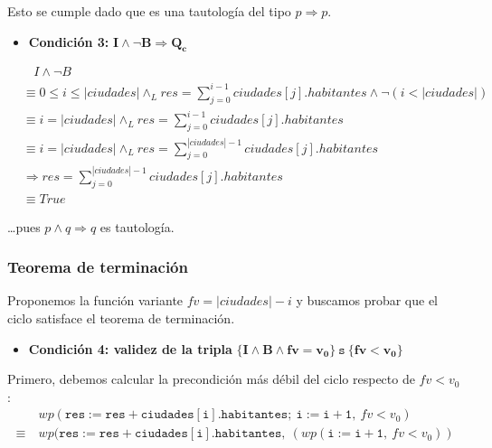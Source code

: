 \documentclass[10pt,a4paper]{article}
\begin{document}
Esto se cumple dado que es una tautología del tipo $p \Rightarrow p$. \\


\begin{itemize}
    \item{\textbf{Condición 3:} $\mathbf{I \land \lnot B \Rightarrow Q_c}$}
\end{itemize}

\setcounter{equation}{0}
\begin{align}
        \nonumber & \ \ \ \ I \land \lnot B \\ 
        & \equiv 0 \leq i \leq |ciudades| \land_L res = \sum_{j = 0}^{i - 1} ciudades[j].habitantes \land \lnot (i < |ciudades|) \\
        & \equiv i = |ciudades| \land_L res = \sum_{j = 0}^{i - 1} ciudades[j].habitantes \\
        & \equiv i = |ciudades| \land_L res = \sum_{j = 0}^{|ciudades| - 1} ciudades[j].habitantes \\
        \nonumber & \Rightarrow res = \sum_{j = 0}^{|ciudades| - 1} ciudades[j].habitantes \\
        \nonumber & \equiv True
\end{align}

\ldots pues $p \land q \Rightarrow q$ es tautología.



\subsubsection{Teorema de terminación}
Proponemos la función variante $fv = |ciudades| - i$ y buscamos probar que el ciclo satisface el teorema de terminación. \\

\begin{itemize}
    \item{\textbf{Condición 4: validez de la tripla} $\mathbf{\{I \land B \land fv = v_0\} \ \texttt{s} \ \{fv < v_0\}}$}
\end{itemize}
Primero, debemos calcular la precondición más débil del ciclo respecto de $fv < v_0$:
\begin{equation*} 
    \begin{split}
    & wp(\mathtt{res := res + ciudades[i].habitantes; \ i := i + 1}, \ fv < v_0) \\
    \equiv \ & wp(\mathtt{res := res + ciudades[i].habitantes}, \ (wp(\mathtt{i := i + 1}, \ fv < v_0))
    \end{split}
\end{equation*}
\end{document}
